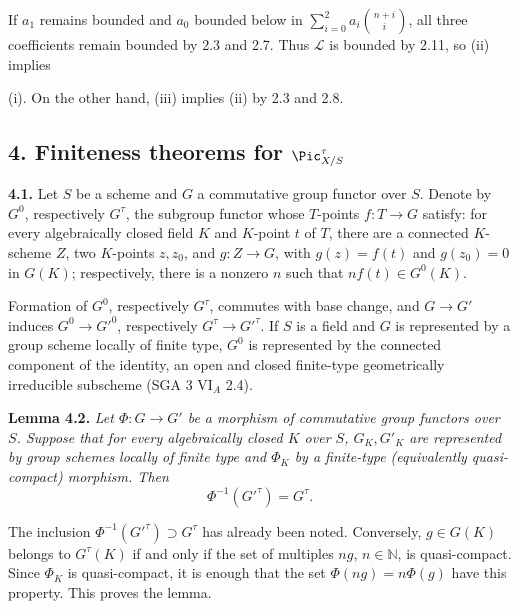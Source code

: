If \(a_1\) remains bounded and \(a_0\) bounded below in
\(\sum_{i=0}^{2}a_i\binom{n+i}{i}\), all three coefficients remain
bounded by 2.3 and 2.7. Thus \(\mathscr L\) is bounded by 2.11, so (ii)
implies

(i). On the other hand, (iii) implies (ii) by 2.3 and 2.8.

\subsection*{4. Finiteness theorems for \(\Pic^\tau_{X/S}\)}

\textbf{4.1.} Let \(S\) be a scheme and \(G\) a commutative group functor
over \(S\). Denote by \(G^0\), respectively \(G^\tau\), the subgroup
functor whose \(T\)-points \(f:T\to G\) satisfy: for every algebraically
closed field \(K\) and \(K\)-point \(t\) of \(T\), there are a connected
\(K\)-scheme \(Z\), two \(K\)-points \(z,z_0\), and \(g:Z\to G\), with
\(g(z)=f(t)\) and \(g(z_0)=0\) in \(G(K)\); respectively, there is a
nonzero \(n\) such that \(nf(t)\in G^0(K)\).

Formation of \(G^0\), respectively \(G^\tau\), commutes with base change,
and \(G\to G'\) induces \(G^0\to G'^0\), respectively
\(G^\tau\to G'^\tau\). If \(S\) is a field and \(G\) is represented by a
group scheme locally of finite type, \(G^0\) is represented by the
connected component of the identity, an open and closed finite-type
geometrically irreducible subscheme (SGA 3 VI\(_A\) 2.4).

\textbf{Lemma 4.2.} \emph{Let \(\Phi:G\to G'\) be a morphism of
commutative group functors over \(S\). Suppose that for every
algebraically closed \(K\) over \(S\), \(G_K,G'_K\) are represented by
group schemes locally of finite type and \(\Phi_K\) by a finite-type
(equivalently quasi-compact) morphism. Then}
\[
\Phi^{-1}(G'^\tau)=G^\tau.
\]

The inclusion \(\Phi^{-1}(G'^\tau)\supset G^\tau\) has already been
noted. Conversely, \(g\in G(K)\) belongs to \(G^\tau(K)\) if and only if
the set of multiples \(ng\), \(n\in\mathbb N\), is quasi-compact. Since
\(\Phi_K\) is quasi-compact, it is enough that the set
\(\Phi(ng)=n\Phi(g)\) have this property. This proves the lemma.

